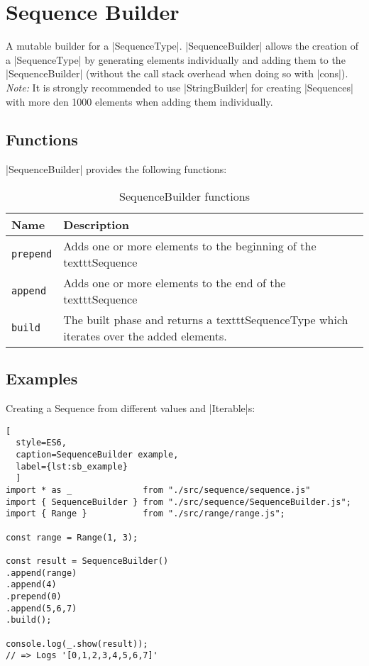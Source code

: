 \section{Sequence Builder}
\label{sec:Sequence Builder}
A mutable builder for a |SequenceType|.
\newline
|SequenceBuilder| allows the creation of a |SequenceType| by generating elements individually 
and adding them to the |SequenceBuilder| (without the call stack overhead when doing so
with |cons|).
\newline
\textit{Note:} It is strongly recommended to use |StringBuilder| for creating
|Sequences| with more den 1000 elements when adding them individually.

\subsection{Functions}
\label{sub:sb_Functions}

|SequenceBuilder| provides the following functions:

\begin{table}[H]
  \centering
  \begin{tabularx}{\textwidth}{| l | X |} \hline
    \textbf{Name}    & \textbf{Description} \\ \hline
    \texttt{prepend} & Adds one or more elements to the beginning of the texttt{Sequence}\\ \hline 
    \texttt{append}  & Adds one or more elements to the end of the texttt{Sequence} \\ \hline 
    \texttt{build}   & The built phase and returns a texttt{SequenceType} which iterates over the added elements. \\ \hline 
   \end{tabularx}
  \caption{SequenceBuilder functions}
  \label{tab:sb_functions}
\end{table}

\subsection{Examples}
\label{sub:sb_Examples}
Creating a Sequence from different values and |Iterable|s:

\begin{lstlisting}[
  style=ES6, 
  caption=SequenceBuilder example,
  label={lst:sb_example}
  ]
import * as _              from "./src/sequence/sequence.js"
import { SequenceBuilder } from "./src/sequence/SequenceBuilder.js";
import { Range }           from "./src/range/range.js";

const range = Range(1, 3);

const result = SequenceBuilder()
.append(range)
.append(4)
.prepend(0)
.append(5,6,7)
.build();

console.log(_.show(result));
// => Logs '[0,1,2,3,4,5,6,7]'
\end{lstlisting}
